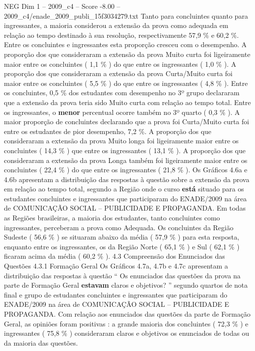 \begin{textsample}{NEG Dim 1 – 2009\_c4 – Score -8.00 – 2009\_c4/enade\_2009\_publi\_15f3034279.txt}
Tanto para concluintes quanto para ingressantes, a maioria considerou a extensão da prova como adequada em relação ao tempo destinado à sua resolução, respectivamente 57,9 \% e 60,2 \%.
Entre os concluintes e ingressantes esta proporção cresceu com o desempenho.
A proporção dos que consideraram a extensão da prova Muito curta foi ligeiramente maior entre os concluintes ( 1,1 \% ) do que entre os ingressantes ( 1,0 \% ).
A proporção dos que consideraram a extensão da prova Curta/Muito curta foi maior entre os concluintes ( 5,5 \% ) do que entre os ingressantes ( 4,8 \% ).
Entre os concluintes, 0,5 \% dos estudantes com desempenho no 3º grupo declararam que a extensão da prova teria sido Muito curta com relação ao tempo total.
Entre os ingressantes, o \textbf{menor} percentual ocorre também no 3º quarto ( 0,3 \% ).
A maior proporção de concluintes declarando que a prova foi Curta/Muito curta foi entre os estudantes de pior desempenho, 7,2 \%.
A proporção dos que consideraram a extensão da prova Muito longa foi ligeiramente maior entre os concluintes ( 14,3 \% ) que entre os ingressantes ( 13,1 \% ).
A proporção dos que consideraram a extensão da prova Longa também foi ligeiramente maior entre os concluintes ( 22,4 \% ) do que entre os ingressantes ( 21,8 \% ).
Os Gráficos 4.6a e 4.6b apresentam a distribuição das respostas à questão sobre a extensão da prova em relação ao tempo total, segundo a Região onde o curso \textbf{está} situado para os estudantes concluintes e ingressantes que participaram do ENADE/2009 na área de COMUNICAÇÃO SOCIAL – PUBLICIDADE E PROPAGANDA.
Em todas as Regiões brasileiras, a maioria dos estudantes, tanto concluintes como ingressantes, perceberam a prova como Adequada.
Os concluintes da Região Sudeste ( 56,6 \% ) se situaram abaixo da média ( 57,9 \% ) para esta resposta, enquanto entre os ingressantes, os da Região Norte ( 65,1 \% ) e Sul ( 62,1 \% ) ficaram acima da média ( 60,2 \% ). 4.3 Compreensão dos Enunciados das Questões 4.3.1 Formação Geral Os Gráficos 4.7a, 4.7b e 4.7c apresentam a distribuição das respostas à questão “ Os enunciados das questões da prova na parte de Formação Geral \textbf{estavam} claros e objetivos? ” segundo quartos de nota final e grupo de estudantes concluintes e ingressantes que participaram do ENADE/2009 na área de COMUNICAÇÃO SOCIAL – PUBLICIDADE E PROPAGANDA.
Com relação aos enunciados das questões da parte de Formação Geral, as opiniões foram positivas : a grande maioria dos concluintes ( 72,3 \% ) e ingressantes ( 75,8 \% ) consideraram claros e objetivos os enunciados de todas ou da maioria das questões.

\end{textsample}
